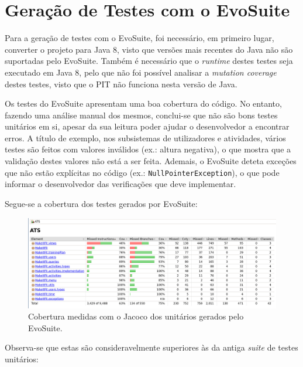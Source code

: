 \documentclass[12pt, a4paper]{article}
\begin{document}
\section{Geração de Testes com o EvoSuite}

Para a geração de testes com o EvoSuite, foi necessário, em primeiro lugar, converter o projeto para
Java 8, visto que versões mais recentes do Java não são suportadas pelo EvoSuite. Também é
necessário que o \emph{runtime} destes testes seja executado em Java 8, pelo que não foi possível
analisar a \emph{mutation coverage} destes testes, visto que o PIT não funciona nesta versão de
Java.

Os testes do EvoSuite apresentam uma boa cobertura do código. No entanto, fazendo uma análise manual
dos mesmos, conclui-se que não são bons testes unitários em si, apesar da sua leitura poder ajudar
o desenvolvedor a encontrar erros. A título de exemplo, nos subsistemas de utilizadores e
atividades, vários testes são feitos com valores inválidos (ex.: altura negativa), o que mostra que
a validação destes valores não está a ser feita. Ademais, o EvoSuite deteta exceções que não estão
explícitas no código (ex.: \texttt{NullPointerException}), o que pode informar o desenvolvedor das
verificações que deve implementar.

Segue-se a cobertura dos testes gerados por EvoSuite:

\begin{figure}[H]
    \includegraphics[width=\textwidth]{res/EvoSuiteJacoco.png}
    \caption{Cobertura medidas com o Jacoco dos unitários gerados pelo EvoSuite.}
\end{figure}

Observa-se que estas são consideravelmente superiores às da antiga \emph{suite} de testes unitários:
\end{document}
